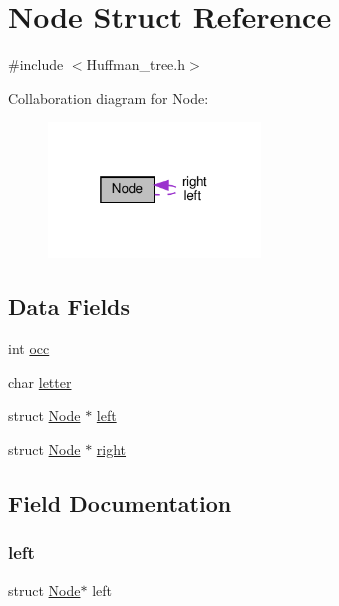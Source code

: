 \hypertarget{struct_node}{}\section{Node Struct Reference}
\label{struct_node}


{\ttfamily \#include $<$Huffman\+\_\+tree.\+h$>$}



Collaboration diagram for Node\+:\nopagebreak
\begin{figure}[H]
\begin{center}
\leavevmode
\includegraphics[width=160pt]{struct_node__coll__graph}
\end{center}
\end{figure}
\subsection*{Data Fields}
\begin{DoxyCompactItemize}
\item 
int \hyperlink{struct_node_af31c4cdd2ddb799512125a78038c283f}{occ}
\item 
char \hyperlink{struct_node_ac632f0e58c93e01b2bfbb3015c8de34f}{letter}
\item 
struct \hyperlink{struct_node}{Node} $\ast$ \hyperlink{struct_node_a25eed0b3ce3478a3edb4a00c81dedd5e}{left}
\item 
struct \hyperlink{struct_node}{Node} $\ast$ \hyperlink{struct_node_a760682e46f54442d313a05d18095b52f}{right}
\end{DoxyCompactItemize}


\subsection{Field Documentation}
\mbox{\label{struct_node_a25eed0b3ce3478a3edb4a00c81dedd5e}} 
\subsubsection{\texorpdfstring{left}{left}}
{\footnotesize\ttfamily struct \hyperlink{struct_node}{Node}$\ast$ left}

